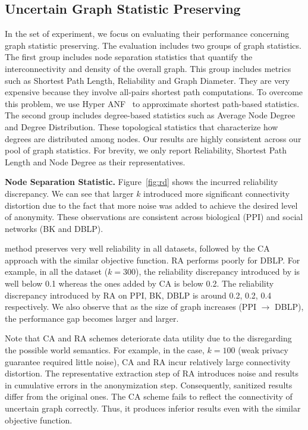 \subsection{Uncertain Graph Statistic Preserving}
In the set of experiment, we focus on evaluating their performance concerning graph statistic preserving. 
The evaluation includes two groups of graph statistics. 
The first group includes node separation statistics that quantify the interconnectivity and density of the overall graph.   
This group includes metrics such as Shortest Path Length, Reliability and Graph Diameter. 
They are very expensive because they involve all-pairs shortest path computations. 
To overcome this problem, we use Hyper ANF~\cite{Boldi_Rosa_Vigna_2011} to approximate shortest path-based statistics.
The second group includes degree-based statistics such as Average  Node Degree and Degree Distribution.
These topological statistics that characterize how degrees are distributed among nodes. 
Our results are highly consistent across our pool of graph statistics.
For brevity, we only report  Reliability, Shortest Path Length and Node Degree as their representatives. 

\textbf{Node Separation Statistic.} 
Figure~\ref{fig:rd} shows the incurred reliability discrepancy. 
We can see that larger $k$ introduced more significant connectivity distortion due to the fact that more noise was added to achieve the desired level of anonymity.   
These observations are consistent across biological (PPI) and social  networks (BK and DBLP).

{\methodName} method preserves very well reliability in all datasets, followed by the CA approach with the similar objective function. RA performs poorly for DBLP. 
For example, in all the dataset ($k=300$), the reliability discrepancy introduced by {\methodName} is well below 0.1 whereas the ones added by CA is below 0.2. The reliability discrepancy introduced by RA on PPI, BK, DBLP is around 0.2, 0.2, 0.4 respectively. We also observe that as the size of graph increases (PPI $\rightarrow$ DBLP), the performance gap becomes larger and larger.

Note that CA and RA schemes deteriorate data utility due to the disregarding the possible world semantics. 
For example, in the case, $k=100$ (weak privacy guarantee required little noise), CA and RA incur relatively large connectivity distortion.  
The representative extraction step of RA introduces noise and results in cumulative errors in the anonymization step. Consequently, sanitized results differ from the original ones. 
The CA scheme fails to reflect the connectivity of uncertain graph correctly. Thus, it produces inferior results even with the similar objective function.  

